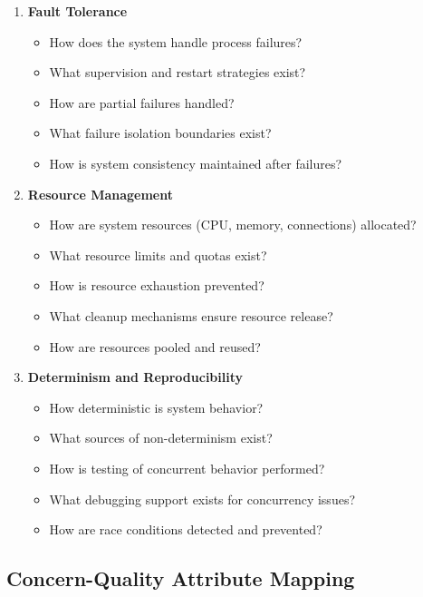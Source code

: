 \documentclass[11pt,letterpaper]{article}
\begin{document}
\begin{enumerate}[label=\textbf{C\arabic*:}, leftmargin=2.5em]
    \item \textbf{Fault Tolerance}
    \begin{itemize}[nosep]
        \item How does the system handle process failures?
        \item What supervision and restart strategies exist?
        \item How are partial failures handled?
        \item What failure isolation boundaries exist?
        \item How is system consistency maintained after failures?
    \end{itemize}
    
    \item \textbf{Resource Management}
    \begin{itemize}[nosep]
        \item How are system resources (CPU, memory, connections) allocated?
        \item What resource limits and quotas exist?
        \item How is resource exhaustion prevented?
        \item What cleanup mechanisms ensure resource release?
        \item How are resources pooled and reused?
    \end{itemize}
    
    \item \textbf{Determinism and Reproducibility}
    \begin{itemize}[nosep]
        \item How deterministic is system behavior?
        \item What sources of non-determinism exist?
        \item How is testing of concurrent behavior performed?
        \item What debugging support exists for concurrency issues?
        \item How are race conditions detected and prevented?
    \end{itemize}
\end{enumerate}

\subsection{Concern-Quality Attribute Mapping}
\end{document}
